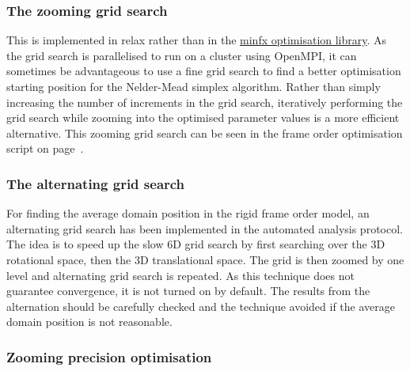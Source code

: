 

\subsubsection{The zooming grid search}

This is implemented in relax rather than in the \href{https://gna.org/projects/minfx/}{minfx optimisation library}.
As the grid search is parallelised to run on a cluster using OpenMPI, it can sometimes be advantageous to use a fine grid search to find a better optimisation starting position for the Nelder-Mead simplex algorithm.
Rather than simply increasing the number of increments in the grid search, iteratively performing the grid search while zooming into the optimised parameter values is a more efficient alternative.
This zooming grid search can be seen in the frame order optimisation script on page~\pageref{sect: frame order analysis script}.






\subsubsection{The alternating grid search}

For finding the average domain position in the rigid frame order model, an alternating grid search has been implemented in the automated analysis protocol.
The idea is to speed up the slow 6D grid search by first searching over the 3D rotational space, then the 3D translational space.
The grid is then zoomed by one level and alternating grid search is repeated.
As this technique does not guarantee convergence, it is not turned on by default.
The results from the alternation should be carefully checked and the technique avoided if the average domain position is not reasonable.






\subsubsection{Zooming precision optimisation}

